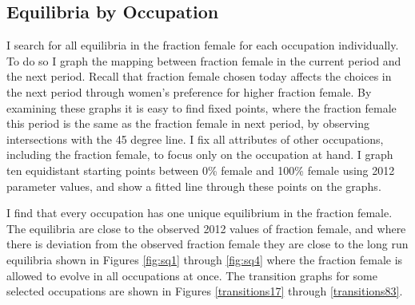\documentclass[11pt]{article}
\begin{document}

%

\subsection{Equilibria by Occupation}
I search for all equilibria in the fraction female for each occupation individually. To do so I graph the mapping between fraction female in the current period and the next period. Recall that fraction female chosen today affects the choices in the next period through women's preference for higher fraction female. By examining these graphs it is easy to find fixed points, where the fraction female this period is the same as the fraction female in next period, by observing intersections with the 45 degree line. I fix all attributes of other occupations, including the fraction female, to focus only on the occupation at hand. I graph ten equidistant starting points between 0\% female and 100\% female using 2012 parameter values, and show a fitted line through these points on the graphs.

I find that every occupation has one unique equilibrium in the fraction female. The equilibria are close to the observed 2012 values of fraction female, and where there is deviation from the observed fraction female they are close to the long run equilibria shown in Figures \ref{fig:sq1} through \ref{fig:sq4} where the fraction female is allowed to evolve in all occupations at once. The transition graphs for some selected occupations are shown in Figures \ref{transitions17} through \ref{transitions83}.


\end{document}
